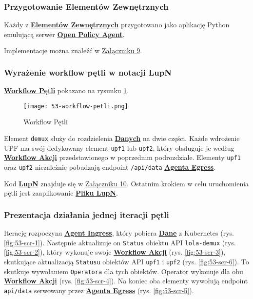 \subsubsection{Przygotowanie Elementów Zewnętrznych}

Każdy z \hyperlink{def:element-zewnetrzny}{\textbf{Elementów Zewnętrznych}} przygotowano jako aplikację Python emulującą serwer \hyperlink{def:opa}{\textbf{Open Policy Agent}}.

Implementacje można znaleźć w \hyperlink{appendix:9}{Załączniku 9}.

\subsubsection{Wyrażenie workflow pętli w notacji LupN}

\hyperlink{def:workflow-petli}{\textbf{Workflow Pętli}} pokazano na rysunku \ref{fig:53-workflow-petli}.

\begin{figure}[!h]
    \centering \texttt{[image: 53-workflow-petli.png]}
    \caption{Workflow Pętli}\label{fig:53-workflow-petli}
\end{figure}

Element \texttt{demux} służy do rozdzielenia \hyperlink{def:dane}{\textbf{Danych}} na dwie części. Każde wdrożenie UPF ma swój dedykowany element \texttt{upf1} lub \texttt{upf2}, który obsługuje je według \hyperlink{def:workflow-petli}{\textbf{Workflow Akcji}} przedstawionego w poprzednim podrozdziale. Elementy \texttt{upf1} oraz \texttt{upf2} niezależnie pobudzają endpoint \texttt{/api/data} \hyperlink{def:agent-egress}{\textbf{Agenta Egress}}.

Kod \hyperlink{def:lupn}{\textbf{LupN}} znajduje się w \hyperlink{appendix:10}{Załączniku 10}. Ostatnim krokiem w celu uruchomienia pętli jest zaaplikowanie \hyperlink{def:plik-lupn}{\textbf{Pliku LupN}}.

\subsubsection{Prezentacja działania jednej iteracji pętli}

Iterację rozpoczyna \hyperlink{def:agent-ingress}{\textbf{Agent Ingress}}, który pobiera \hyperlink{def:dane}{\textbf{Dane}} z Kubernetes (rys. \ref{fig:53-scr-1}). Następnie aktualizuje on \texttt{Status} obiektu API \texttt{lola-demux} (rys. \ref{fig:53-scr-2}), który wykonuje swoje \hyperlink{def:workflow-petli}{\textbf{Workflow Akcji}} (rys. \ref{fig:53-scr-3}), skutkujące aktualizacją \texttt{Statusu} obiektów API \texttt{upf1} i \texttt{upf2} (rys. \ref{fig:53-scr-6}). To skutkuje wywołaniem \texttt{Operatora} dla tych obiektów. Operator wykonuje dla obu \hyperlink{def:workflow-petli}{\textbf{Workflow Akcji}} (rys. \ref{fig:53-scr-4}). Na koniec oba elementy wywołują endpoint \texttt{api/data} serwowany przez \hyperlink{def:agent-egress}{\textbf{Agenta Egress}} (rys. \ref{fig:53-scr-5}).


